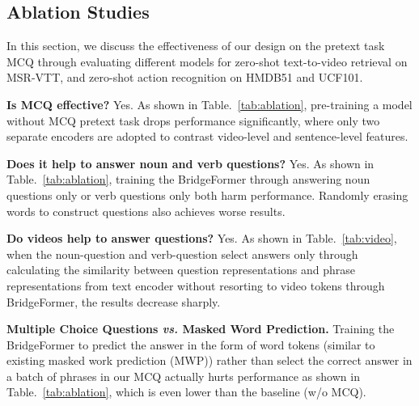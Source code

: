 \documentclass[10pt,twocolumn,letterpaper]{article}
\begin{document}
\begin{table}\centering
	\vspace{5pt}
	\caption{Ablation study on the effects of video information when answering the questions. Results on WebVid-2M validation set for noun or verb questions are reported.} 
	\vspace{-5pt} 
	\vspace{-10pt}
	\label{tab:video}
\end{table}

\subsection{Ablation Studies}
In this section, we discuss the effectiveness of our design on the pretext task MCQ through evaluating different models for zero-shot text-to-video retrieval on MSR-VTT, and zero-shot action recognition on HMDB51 and UCF101.

{\flushleft \bf Is MCQ effective?} Yes. As shown in Table.~\ref{tab:ablation}, pre-training a model without MCQ pretext task drops performance significantly, where only two separate encoders are adopted to contrast video-level and sentence-level features. 

{\flushleft \bf Does it help to answer noun and verb questions?} Yes.  As shown in Table.~\ref{tab:ablation}, training the BridgeFormer through answering noun questions only or verb questions only both harm performance. Randomly erasing words to construct questions also achieves worse results. 

{\flushleft \bf Do videos help to answer questions?} Yes. As shown in Table.~\ref{tab:video}, when the noun-question and verb-question select answers only through calculating the similarity between question representations and phrase representations from text encoder  without resorting to video tokens through BridgeFormer, the results decrease sharply. 

{\flushleft \bf Multiple Choice Questions \textit{vs.} Masked Word Prediction.} Training the BridgeFormer to predict the answer in the form of word tokens (similar to existing masked work prediction (MWP)) rather than select the correct answer in a batch of phrases in our MCQ actually hurts performance as shown in Table.~\ref{tab:ablation}, which is even lower than the baseline (w/o MCQ).
\end{document}
